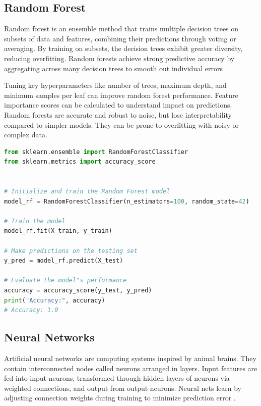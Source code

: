 \subsection{Random Forest}

Random forest is an ensemble method that trains multiple decision trees on subsets of data and features, combining their predictions through voting or averaging. By training on subsets, the decision trees exhibit greater diversity, reducing overfitting. Random forests achieve strong predictive accuracy by aggregating across many decision trees to smooth out individual errors \cite{breiman2001random}.

Tuning key hyperparameters like number of trees, maximum depth, and minimum samples per leaf can improve random forest performance. Feature importance scores can be calculated to understand impact on predictions. Random forests are accurate and robust to noise, but lose interpretability compared to simpler models. They can be prone to overfitting with noisy or complex data.



\begin{lstlisting}[language=Python]
from sklearn.ensemble import RandomForestClassifier
from sklearn.metrics import accuracy_score


# Initialize and train the Random Forest model
model_rf = RandomForestClassifier(n_estimators=100, random_state=42)

# Train the model
model_rf.fit(X_train, y_train)

# Make predictions on the testing set
y_pred = model_rf.predict(X_test)

# Evaluate the model"s performance
accuracy = accuracy_score(y_test, y_pred)
print("Accuracy:", accuracy)
# Accuracy: 1.0
\end{lstlisting}



\subsection{Neural Networks}

Artificial neural networks are computing systems inspired by animal brains. They contain interconnected nodes called neurons arranged in layers. Input features are fed into input neurons, transformed through hidden layers of neurons via weighted connections, and output from output neurons. Neural nets learn by adjusting connection weights during training to minimize prediction error \cite{picton1994neural}.


